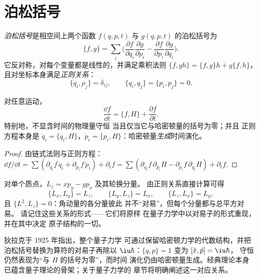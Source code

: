 \section{泊松括号}

\begin{definition}[泊松括号]\label{def:b3:hamiltonian-mechanics:poisson}
\emph{泊松括号}是相空间上两个函数 $f(q, p, t)$ 与
$g(q, p, t)$ 的泊松括号为
\[
\{f, g\} = \sum_i\Big(
 \frac{\partial f}{\partial q_i}\frac{\partial g}{\partial p_i}
 - \frac{\partial f}{\partial p_i}\frac{\partial g}{\partial q_i}\Big) .
\]
它反对称，对每个变量都是线性的，并满足乘积法则
$\{f, gh\} = \{f, g\}h + g\{f, h\}$，
且对坐标本身满足\emph{正则关系}：
\[
\{q_i, p_j\} = \delta_{ij} , \qquad
\{q_i, q_j\} = \{p_i, p_j\} = 0 .
\]
\end{definition}

\begin{theorem}[以括号表示的演化]\label{thm:b3:hamiltonian-mechanics:evolution}
对任意运动，
\[
\frac{\dd f}{\dd t} = \{f, H\} + \frac{\partial f}{\partial t} .
\]
特别地，不显含时间的物理量守恒
当且仅当它与哈密顿量的括号为零；并且
正则方程本身是 $\dot q_i = \{q_i, H\}$，$\dot p_i
= \{p_i, H\}$：哈密顿量\emph{生成}时间演化。
\end{theorem}

\begin{proof}
由链式法则与正则方程：$\dd f/\dd t = \sum(
\partial_{q_i}f\,\dot q_i + \partial_{p_i}f\,\dot p_i) + \partial_tf =
\sum(\partial_{q_i}f\,\partial_{p_i}H - \partial_{p_i}f\,
\partial_{q_i}H) + \partial_tf$.
\end{proof}

\begin{example}[角动量的括号]\label{ex:b3:hamiltonian-mechanics:brackets}
对单个质点，$L_z = xp_y - yp_x$ 及其轮换分量。
由正则关系直接计算可得
\[
\{L_x, L_y\} = L_z , \qquad
\{L_y, L_z\} = L_x , \qquad
\{L_z, L_x\} = L_y ,
\]
且 $\{L^2, L_z\} = 0$：角动量的各分量彼此
并不“对易”，但每个分量都与总平方对易。
请记住这些关系的形式——它们将原样
在量子力学中以对易子的形式重现，并在其中决定
原子结构的一切。
\end{example}

\begin{remark}[通往量子力学的门户]\label{rem:b3:hamiltonian-mechanics:doorway}
狄拉克于 1925 年指出，整个量子力学
可通过保留哈密顿力学的代数结构，并把
泊松括号替换为算符的对易子再除以
$\iu\hbar$：$\{q, p\} = 1$ 变为 $[\hat x, \hat p] = \iu\hbar$，
守恒仍然表现为“与 $H$ 的括号为零”，而时间
演化仍由哈密顿量生成。经典理论本身
已蕴含量子理论的骨架；关于量子力学的
章节将明确阐述这一对应关系。
\end{remark}

